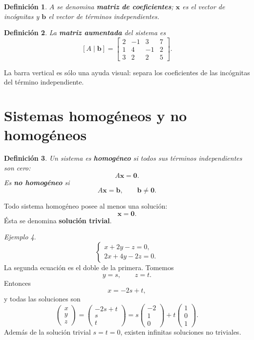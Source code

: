 \documentclass[12pt]{article}
\newtheorem{definicion}{Definición}[section]
\theoremstyle{remark}
\newtheorem{ejemplo}[definicion]{Ejemplo}
\begin{document}
\begin{definicion}
$A$ se denomina \textbf{matriz de coeficientes}; $\mathbf{x}$ es el vector de incógnitas y
$\mathbf{b}$ el vector de términos independientes.
\end{definicion}

\begin{definicion}
La \textbf{matriz aumentada} del sistema es
\[
[A\mid\mathbf b]=
\left[
\begin{array}{ccc|c}
2&-1&3&7\\
1&4&-1&2\\
3&2&2&5
\end{array}
\right].
\]
\end{definicion}

La barra vertical es sólo una ayuda visual: separa los coeficientes de las incógnitas del término
independiente.

\section{Sistemas homogéneos y no homogéneos}

\begin{definicion}
Un sistema es \textbf{homogéneo} si todos sus términos independientes son cero:
\[
A\mathbf{x}=\mathbf{0}.
\]
Es \textbf{no homogéneo} si
\[
A\mathbf{x}=\mathbf{b},\qquad \mathbf b\neq\mathbf0.
\]
\end{definicion}

Todo sistema homogéneo posee al menos una solución:
\[
\mathbf{x}=\mathbf0.
\]
Ésta se denomina \textbf{solución trivial}.

\begin{ejemplo}
\[
\begin{cases}
x+2y-z=0,\\
2x+4y-2z=0.
\end{cases}
\]
La segunda ecuación es el doble de la primera. Tomemos
\[
y=s,\qquad z=t.
\]
Entonces
\[
x=-2s+t,
\]
y todas las soluciones son
\[
\begin{pmatrix}x\\y\\z\end{pmatrix}
=
\begin{pmatrix}-2s+t\\s\\t\end{pmatrix}
=
s\begin{pmatrix}-2\\1\\0\end{pmatrix}
+t\begin{pmatrix}1\\0\\1\end{pmatrix}.
\]
Además de la solución trivial $s=t=0$, existen infinitas soluciones no triviales.
\end{ejemplo}
\end{document}
